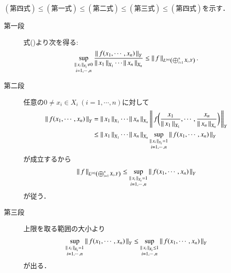 	\begin{prf}$(\mbox{第四式}) \leq (\mbox{第一式}) \leq (\mbox{第二式}) \leq (\mbox{第三式}) \leq (\mbox{第四式})$を示す．
		\begin{description}
			\item[第一段]
				式()より次を得る:
				\begin{align}
					\sup{\substack{\Norm{x_i}{X_i} \neq 0 \\ i=1,\cdots,n}}{
					\frac{\Norm{f(x_1,\cdots,x_n)}{Y}}{\Norm{x_1}{X_1} \cdots \Norm{x_n}{X_n}}}
					\leq \Norm{f}{\ContLn{\bigoplus_{i=1}^n X_i}{Y}{n}}.
				\end{align}
			
			\item[第二段]
				任意の$0 \neq x_i \in X_i\ (i=1,\cdots,n)$に対して
				\begin{align}
					\Norm{f(x_1,\cdots,x_n)}{Y}
					&= \Norm{x_1}{X_1}\cdots\Norm{x_n}{X_n}\Norm{f \biggl( \frac{x_1}{\Norm{x_1}{X_1}},\cdots,\frac{x_n}{\Norm{x_n}{X_n}} \biggr)}{Y} \\
					&\leq \Norm{x_1}{X_1}\cdots\Norm{x_n}{X_n} \sup{\substack{\Norm{x_i}{X_i} = 1 \\ i=1,\cdots,n}}{\Norm{f(x_1,\cdots,x_n)}{Y}}
				\end{align}
				が成立するから
				\begin{align}
					\Norm{f}{\ContLn{\bigoplus_{i=1}^n X_i}{Y}{n}}
					\leq 
					\sup{\substack{\Norm{x_i}{X_i} = 1 \\ i=1,\cdots,n}}{\Norm{f(x_1,\cdots,x_n)}{Y}}
				\end{align}
				が従う．
			
			\item[第三段]
				上限を取る範囲の大小より
				\begin{align}
					\sup{\substack{\Norm{x_i}{X_i} = 1 \\ i=1,\cdots,n}}{\Norm{f(x_1,\cdots,x_n)}{Y}}
					\leq \sup{\substack{\Norm{x_i}{X_i} \leq 1 \\ i=1,\cdots,n}}{\Norm{f(x_1,\cdots,x_n)}{Y}}
				\end{align}
				が出る．
				

\end{description}
\end{prf}
